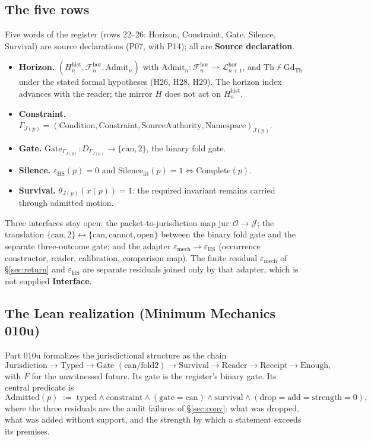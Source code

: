 \documentclass[11pt,a4paper]{article}
\newcommand{\emech}{\varepsilon_{\mathrm{mech}}}\newcommand{\eHS}{\varepsilon_{\mathrm{HS}}}
\newcommand{\st}[1]{\textsf{\small\textbf{#1}}}
\newcommand{\Ssrc}{\st{Source declaration}}\newcommand{\Sint}{\st{Interface}}
\theoremstyle{plain}
\theoremstyle{definition}
\theoremstyle{remark}
\begin{document}
\subsection{The five rows}
Five words of the register (rows 22--26: Horizon, Constraint, Gate, Silence, Survival) are source declarations (P07, with P14); all are \Ssrc.
\begin{itemize}[leftmargin=1.4em]
\item \textbf{Horizon.} $(H^{\mathrm{hist}}_n,\mathcal F^{\mathrm{hor}}_n,\mathrm{Admit}_n)$ with $\mathrm{Admit}_n:\mathcal F^{\mathrm{hor}}_n\rightharpoonup\mathcal L^{\mathrm{hor}}_{n+1}$, and $\mathrm{Th}\nvdash\mathrm{Gd}_{\mathrm{Th}}$ under the stated formal hypotheses (H26, H28, H29). The horizon index advances with the reader; the mirror $H$ does not act on $H^{\mathrm{hist}}_n$.
\item \textbf{Constraint.} $\Gamma_{J(p)}=(\mathrm{Condition},\mathrm{Constraint},\mathrm{SourceAuthority},\mathrm{Namespace})_{J(p)}$.
\item \textbf{Gate.} $\mathrm{Gate}_{\Gamma_{J(p)}}:D_{\Gamma_{J(p)}}\to\{\mathrm{can},2\}$, the binary fold gate.
\item \textbf{Silence.} $\eHS(p)=0$ and $\mathrm{Silence}_{\mathrm{fit}}(p)=1\iff\mathrm{Complete}(p)$.
\item \textbf{Survival.} $\theta_{J(p)}(x(p))=1$: the required invariant remains carried through admitted motion.
\end{itemize}
Three interfaces stay open: the packet-to-jurisdiction map $\mathrm{jur}:\mathcal O\to\mathcal J$; the translation $\{\mathrm{can},2\}\leftrightarrow\{\mathrm{can},\mathrm{cannot},\mathrm{open}\}$ between the binary fold gate and the separate three-outcome gate; and the adapter $\emech\to\eHS$ (occurrence constructor, reader, calibration, comparison map). The finite residual $\emech$ of \S\ref{sec:return} and $\eHS$ are separate residuals joined only by that adapter, which is not supplied \Sint.

\subsection{The Lean realization (Minimum Mechanics 010u)}\label{sec:010u}
Part 010u formalizes the jurisdictional structure as the chain
\[
\text{Jurisdiction}\to\text{Typed}\to\text{Gate }(\mathrm{can}/\mathrm{fold2})\to\text{Survival}\to\text{Reader}\to\text{Receipt}\to\text{Enough},
\]
with $F$ for the unwitnessed future. Its gate is the register's binary gate. Its central predicate is
\[
\mathrm{Admitted}(p)\;:=\;\text{typed}\wedge\text{constraint}\wedge(\text{gate}=\mathrm{can})\wedge\text{survival}\wedge(\text{drop}=\text{add}=\text{strength}=0),
\]
where the three residuals are the audit failures of \S\ref{sec:conv}: what was dropped, what was added without support, and the strength by which a statement exceeds its premises.
\end{document}
